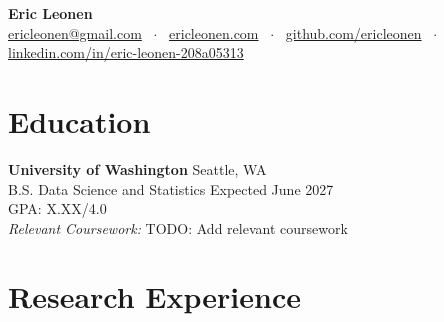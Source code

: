 \documentclass[11pt,letterpaper]{article}
\begin{document}
\begin{center}
  {\LARGE\bfseries Eric Leonen} \\[6pt]
  \small
  \href{mailto:ericleonen@gmail.com}{ericleonen@gmail.com}
  ~$\cdot$~
  \href{https://ericleonen.com}{ericleonen.com}
  ~$\cdot$~
  \href{https://github.com/ericleonen}{github.com/ericleonen}
  ~$\cdot$~
  \href{https://linkedin.com/in/eric-leonen-208a05313}{linkedin.com/in/eric-leonen-208a05313}
\end{center}

\vspace{4pt}

\section{Education}

\textbf{University of Washington} \hfill Seattle, WA \\
B.S. Data Science and Statistics \hfill Expected June 2027 \\
GPA: X.XX/4.0 \\[2pt]
\textit{Relevant Coursework:} TODO: Add relevant coursework

\section{Research Experience}
\end{document}
